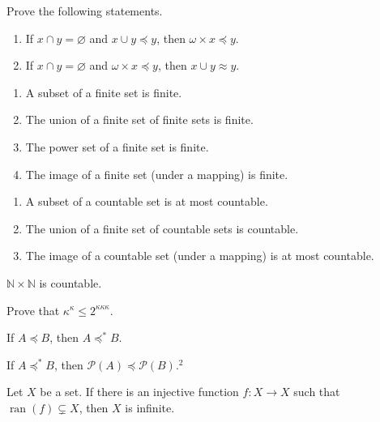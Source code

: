 \documentclass{ctexart}
\newif\ifpreface
\begin{document}
\large
\setlength{\baselineskip}{1.2em}
\ifpreface

\else
\maketitle
\fi
{}
\begin{problem}
Prove the following statements.
\begin{enumerate}
\item If $x \cap y=\varnothing$ and $x \cup y \preccurlyeq y$, then $\omega \times x \preccurlyeq y$.
\item If $x \cap y=\varnothing$ and $\omega \times x \preccurlyeq y$, then $x \cup y \approx y$.
\end{enumerate}
\end{problem}
\newcommand{\peq}{\preccurlyeq}

\begin{problem}
\begin{enumerate}[ref=\theproblem.\arabic*]
\item\label{it:2.1} A subset of a finite set is finite.
\item\label{it:2.2} The union of a finite set of finite sets is finite.
\item The power set of a finite set is finite.
\item The image of a finite set (under a mapping) is finite.
\end{enumerate}
\end{problem}


\begin{problem}
\begin{enumerate}
\item A subset of a countable set is at most countable.
\item The union of a finite set of countable sets is countable.
\item The image of a countable set (under a mapping) is at most countable.
\end{enumerate}
\end{problem}


\begin{problem}
$\mathbb{N} \times \mathbb{N}$ is countable.
\end{problem}


\begin{problem}
Prove that $\kappa^\kappa \leq 2^{\kappa \kappa \kappa}$.
\end{problem}

\begin{problem}
If $A \preccurlyeq B$, then $A \preccurlyeq^* B$.
\end{problem}

\begin{problem}
If $A \preccurlyeq^* B$, then $\mathscr{P}(A) \preccurlyeq \mathscr{P}(B) .^2$
\end{problem}

\begin{problem}
Let $X$ be a set. If there is an injective function $f: X \rightarrow X$ such that $\operatorname{ran}(f) \subsetneq X$, then $X$ is infinite.
\end{problem}
\end{document}
